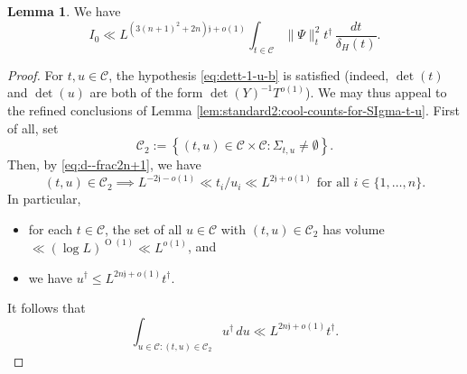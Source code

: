 \documentclass[reqno]{amsart}
\def\O{\operatorname{O}}
\theoremstyle{plain} \newtheorem{theorem} {Theorem}
\theoremstyle{definition} \newtheorem{definition} [theorem] {Definition}
\theoremstyle{itplain} %
\newtheorem{lemma}[theorem]{Lemma}
\numberwithin{equation}{section}
\numberwithin{theorem}{section}
\renewcommand{\leq}{\leqslant}
\begin{document}
\begin{lemma}
  We have
  \begin{equation}\label{eq:i_1-ll-l}
  I_0 \ll
 L ^{(3(n+1)^2 + 2n) \mathfrak{j} + o(1)}
 \int _{t \in \mathcal{C} } \|\Psi\|_t^2
 t ^\dagger  \, \frac{d t}{\delta_H(t)}.
\end{equation}
\end{lemma}
\begin{proof}
For $t,u \in \mathcal{C}$, the hypothesis \eqref{eq:dett-1-u-b} is satisfied (indeed, $\det(t)$ and $\det(u)$ are both of the form $\det(Y)^{-1} T^{o(1)}$).  We may thus appeal to the refined conclusions of Lemma \ref{lem:standard2:cool-counts-for-SIgma-t-u}.  First of all, set
\begin{equation*}
  \mathcal{C}_2 := \left\{ (t,u) \in \mathcal{C} \times \mathcal{C} : \Sigma_{t,u} \neq \emptyset 
  \right\}.
\end{equation*}
Then, by \eqref{eq:d--frac2n+1}, we have
\begin{equation*}
  (t,u) \in \mathcal{C}_2 \implies
  L^{-2 \mathfrak{j} - o(1)} \ll t_i / u_i \ll L^{2 \mathfrak{j} + o(1)} \text{ for all } i \in \{1,\dotsc,n\}.
\end{equation*}
In particular,
\begin{itemize}
\item for each $t \in \mathcal{C}$, the set of all $u \in \mathcal{C}$ with $(t,u) \in \mathcal{C}_2$ has volume $\ll (\log L)^{\O(1)} \ll L^{o(1)}$, and
\item we have $u ^\dagger \leq L ^{2 n \mathfrak{j} + o (1)} t ^\dagger$.
\end{itemize}
It follows that
\begin{equation}\label{eq:int-_u-in}
  \int _{u \in \mathcal{C} : (t,u) \in \mathcal{C}_2 }
  u ^\dagger
  \, d u
  \ll  L^{2 n \mathfrak{j}  + o(1)} t ^\dagger.
\end{equation}


\end{proof}
\end{document}
